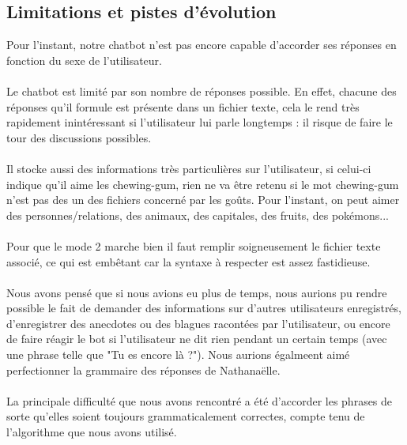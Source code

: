 \documentclass[paper=a4, fontsize=11pt]{article}
\begin{document}
\subsection{Limitations et pistes d'évolution}

Pour l'instant, notre chatbot n'est pas encore capable d'accorder ses réponses en fonction du sexe de l'utilisateur.
\paragraph{} Le chatbot est limité par son nombre de réponses possible. En effet, chacune des réponses qu’il formule est présente dans un fichier texte, cela le rend très rapidement inintéressant si l’utilisateur lui parle longtemps : il risque de faire le tour des discussions possibles. 
\paragraph{} Il stocke aussi des informations très particulières sur l’utilisateur, si celui-ci indique qu’il aime les chewing-gum, rien ne va être retenu si le mot chewing-gum n’est pas des un des fichiers concerné par les goûts. Pour l’instant, on peut aimer des personnes/relations, des animaux, des capitales, des fruits, des pokémons...
\paragraph{} Pour que le mode 2 marche bien il faut remplir soigneusement le fichier texte associé, ce qui est embêtant car la syntaxe à respecter est assez fastidieuse.
\\
\paragraph{} Nous avons pensé que si nous avions eu plus de temps, nous aurions pu rendre possible le fait de demander des informations sur d'autres utilisateurs enregistrés, d'enregistrer des anecdotes ou des blagues racontées par l'utilisateur, ou encore de faire réagir le bot si l'utilisateur ne dit rien pendant un certain temps (avec une phrase telle que "Tu es encore là ?"). Nous aurions égalmeent aimé perfectionner la grammaire des réponses de Nathanaëlle.

\paragraph{} La principale difficulté que nous avons rencontré a été d'accorder les phrases de sorte qu'elles soient toujours grammaticalement correctes, compte tenu de l'algorithme que nous avons utilisé.
\end{document}
